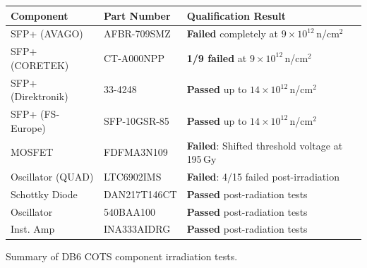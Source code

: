 \documentclass[a0paper,portrait, blockverticalspace=4em, colspace=2em]{tikzposter}
\newcommand{\captiontext}[1]{%
    {\small\renewcommand{\baselinestretch}{0.88}\selectfont#1}}
\begin{document}
\begin{columns}
{    \vspace{0.3cm}
    \begin{center}
    \renewcommand{\arraystretch}{1.2}
    \begin{tabular}{llp{9cm}}
    \toprule
    \textbf{Component} & \textbf{Part Number} & \textbf{Qualification Result} \\
    \midrule
    SFP+ (AVAGO) & AFBR-709SMZ & \textbf{Failed} completely at $9\times 10^{12}$\,n/cm$^2$ \\
    SFP+ (CORETEK) & CT-A000NPP & \textbf{1/9 failed} at $9\times 10^{12}$\,n/cm$^2$ \\
    SFP+ (Direktronik) & 33-4248 & \textbf{Passed} up to $14\times 10^{12}$\,n/cm$^2$ \\
    SFP+ (FS-Europe) & SFP-10GSR-85 & \textbf{Passed} up to $14\times 10^{12}$\,n/cm$^2$ \\
    MOSFET & FDFMA3N109 & \textbf{Failed}: Shifted threshold voltage at 195\,Gy \\
    Oscillator (QUAD) & LTC6902IMS & \textbf{Failed}: 4/15 failed post-irradiation \\
    Schottky Diode & DAN217T146CT & \textbf{Passed} post-radiation tests \\
    Oscillator & 540BAA100 & \textbf{Passed} post-radiation tests \\
    Inst. Amp & INA333AIDRG & \textbf{Passed} post-radiation tests \\
    \bottomrule
    \end{tabular}
    \captiontext{Summary of DB6 COTS component irradiation tests.}
    \end{center}
}


\end{columns}
\end{document}
